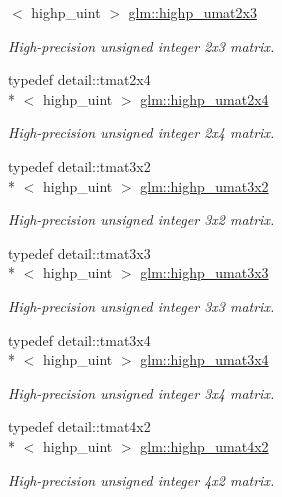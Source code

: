 \begin{DoxyCompactItemize}
$<$ highp\-\_\-uint $>$ \hyperlink{group__gtc__matrix__integer_ga423c173624bfed5e27073987eecf06c2}{glm\-::highp\-\_\-umat2x3}
\begin{DoxyCompactList}\small\item\em High-\/precision unsigned integer 2x3 matrix. \end{DoxyCompactList}\item 
typedef detail\-::tmat2x4\\*
$<$ highp\-\_\-uint $>$ \hyperlink{group__gtc__matrix__integer_ga6989ecc7d0dda60f3c9c9465e9243a78}{glm\-::highp\-\_\-umat2x4}
\begin{DoxyCompactList}\small\item\em High-\/precision unsigned integer 2x4 matrix. \end{DoxyCompactList}\item 
typedef detail\-::tmat3x2\\*
$<$ highp\-\_\-uint $>$ \hyperlink{group__gtc__matrix__integer_gae054a2e2dcecb6d435acc15a25d53ba5}{glm\-::highp\-\_\-umat3x2}
\begin{DoxyCompactList}\small\item\em High-\/precision unsigned integer 3x2 matrix. \end{DoxyCompactList}\item 
typedef detail\-::tmat3x3\\*
$<$ highp\-\_\-uint $>$ \hyperlink{group__gtc__matrix__integer_ga0860bb2a1d49e039eac312c6ad4a1c65}{glm\-::highp\-\_\-umat3x3}
\begin{DoxyCompactList}\small\item\em High-\/precision unsigned integer 3x3 matrix. \end{DoxyCompactList}\item 
typedef detail\-::tmat3x4\\*
$<$ highp\-\_\-uint $>$ \hyperlink{group__gtc__matrix__integer_ga6fd3ea8bf5ccfc7548bbf3e687a05022}{glm\-::highp\-\_\-umat3x4}
\begin{DoxyCompactList}\small\item\em High-\/precision unsigned integer 3x4 matrix. \end{DoxyCompactList}\item 
typedef detail\-::tmat4x2\\*
$<$ highp\-\_\-uint $>$ \hyperlink{group__gtc__matrix__integer_gaa9500361295c8c2fd8bee2b77491a405}{glm\-::highp\-\_\-umat4x2}
\begin{DoxyCompactList}\small\item\em High-\/precision unsigned integer 4x2 matrix. \end{DoxyCompactList}\item 

\end{DoxyCompactItemize}
